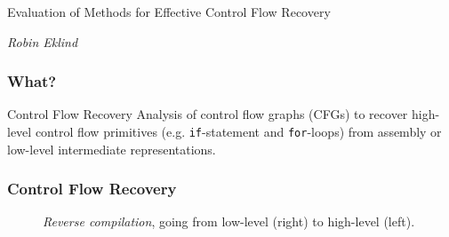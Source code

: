 \documentclass[aspectratio=1610]{beamer}
\begin{document}

\startpage

\begin{frame}

	\vspace{0.02\textheight}

	\begin{Large}
		Evaluation of Methods for Effective Control Flow Recovery
	\end{Large}

	\vspace{0.1\textheight}

	\begin{small}
		\textit{Robin Eklind}
	\end{small}
\end{frame}






\normalpage

\begin{frame}
	\frametitle{What?}

	\begin{block}{Control Flow Recovery}
		Analysis of control flow graphs (CFGs) to recover high-level control flow primitives (e.g. \texttt{if}-statement and \texttt{for}-loops) from assembly or low-level intermediate representations.
	\end{block}
\end{frame}

\begin{frame}
	\frametitle{Control Flow Recovery}

	\begin{figure}[htbp]
		\centering
		\begin{subfigure}[t]{0.27\textwidth}
			\centering
			
		\end{subfigure}
		\quad
		\begin{subfigure}[t]{0.52\textwidth}
			\centering
			
		\end{subfigure}
		\caption{\textit{Reverse compilation}, going from low-level (right) to high-level (left).}
	\end{figure}

\end{frame}
\end{document}
